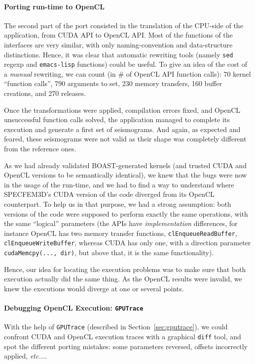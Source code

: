 \documentclass{IEEEtran}
\newcommand{\latin}[1]{\textit{#1}}
\newcommand{\etc}[1]{\latin{etc...}}
\newcommand{\code}[1]{\texttt{#1}}
\begin{document}
\paragraph{Porting run-time to OpenCL} The second part of the port
consisted in the translation of the CPU-side of the application, from
CUDA API to OpenCL API. Most of the functions of the interfaces are
very similar, with only naming-convention and data-structure
distinctions. Hence, it was clear that automatic rewriting tools
(namely \code{sed} regexp and \code{emacs-lisp} functions) could be
useful. To give an idea of the cost of a \emph{manual} rewriting, we
can count (in \# of OpenCL API function calls): 70 kernel ``function
calls'', 790 arguments to set, 230 memory transfers, 160 buffer
creations, and 270 releases.

Once the transformations were applied,
compilation errors fixed, and OpenCL unsuccessful function calls solved,
the application managed to complete its execution and generate a first
set of seismograms. And again, as expected and feared, these
seismograms were not valid as their shape was completely different from the
reference ones.

As we had already validated BOAST-generated kernels (and trusted CUDA and OpenCL
versions to be semantically identical), we knew that the bugs were now in the
usage of the run-time, and we had to find a way to understand where SPECFEM3D's
CUDA version of the code diverged from its OpenCL counterpart. To help us in
that purpose, we had a strong assumption: both versions of the code were
supposed to perform exactly the same operations, with the same ``logical''
parameters (the APIs have \emph{implementation} differences, for instance OpenCL
has two memory transfer functions, \code{clEnqueueReadBuffer},
\code{clEnqueueWriteBuffer}, whereas CUDA has only one, with a direction
parameter \code{cudaMemcpy(..., dir)}, but above that, it is the same
functionality).

Hence, our idea for locating the execution problems was to make sure
that both execution actually did the same thing. As the OpenCL results
were invalid, we knew the executions would diverge at one or several
points.

\paragraph{Debugging OpenCL Execution: \code{GPUTrace}} 

With the help of \code{GPUTrace} (described in Section~\ref{sec:gputrace}), we
could confront CUDA and OpenCL execution traces with a graphical \code{diff}
tool, and spot the different porting mistakes: some parameters reversed,
offsets incorrectly applied, \etc{}. 
\end{document}
